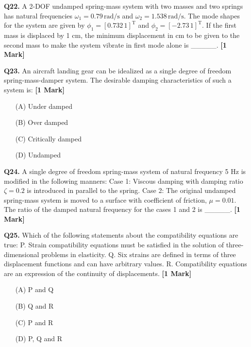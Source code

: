 \documentclass[11pt]{article}
\newcommand{\questiona}[2]{
    \noindent\textbf{Q#2.} #1 \hfill \textbf{[1 Mark]}
}
\begin{document}
\vspace{0.5cm}

\questiona{A 2-DOF undamped spring-mass system with two masses and two springs has natural frequencies $\omega_1 = 0.79\,\text{rad/s}$ and $\omega_2 = 1.538\,\text{rad/s}$. The mode shapes for the system are given by $\phi_1 = [0.732 \, 1]^{\text{T}}$ and $\phi_2 = [-2.73 \, 1]^{\text{T}}$. If the first mass is displaced by 1 cm, the minimum displacement in cm to be given to the second mass to make the system vibrate in first mode alone is \_\_\_\_\_.}{22}

\vspace{0.5cm}

\questiona{An aircraft landing gear can be idealized as a single degree of freedom spring-mass-damper system. The desirable damping characteristics of such a system is:}{23}
\begin{enumerate}
    \item[(A)] Under damped
    \item[(B)] Over damped
    \item[(C)] Critically damped
    \item[(D)] Undamped
\end{enumerate}

\vspace{0.5cm}

\questiona{A single degree of freedom spring-mass system of natural frequency 5 Hz is modified in the following manners:
Case 1: Viscous damping with damping ratio $\zeta = 0.2$ is introduced in parallel to the spring.
Case 2: The original undamped spring-mass system is moved to a surface with coefficient of friction, $\mu = 0.01$.
The ratio of the damped natural frequency for the cases 1 and 2 is \_\_\_\_\_.}{24}

\vspace{0.5cm}

\questiona{Which of the following statements about the compatibility equations are true:
P. Strain compatibility equations must be satisfied in the solution of three-dimensional problems in elasticity.
Q. Six strains are defined in terms of three displacement functions and can have arbitrary values.
R. Compatibility equations are an expression of the continuity of displacements.}{25}
\begin{enumerate}
    \item[(A)] P and Q
    \item[(B)] Q and R
    \item[(C)] P and R
    \item[(D)] P, Q and R
\end{enumerate}
\end{document}
